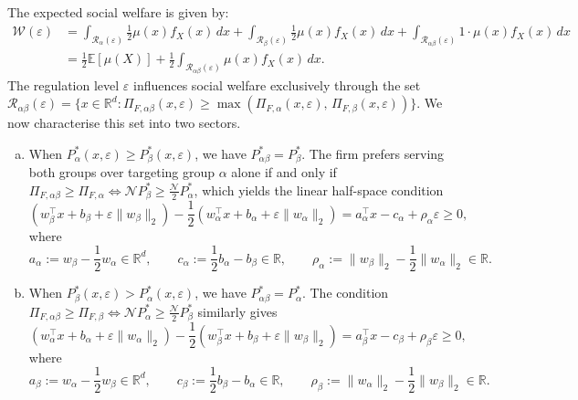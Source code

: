 The expected social welfare is given by:
\begin{equation}
\label{eq:welfare_simplified}
\begin{aligned}
\mathcal{W}(\varepsilon) &= \int_{\mathcal{R}_\alpha(\varepsilon)} \frac{1}{2} \mu(x) f_X(x) \, dx + \int_{\mathcal{R}_\beta(\varepsilon)} \frac{1}{2} \mu(x) f_X(x) \, dx + \int_{\mathcal{R}_{\alpha\beta}(\varepsilon)} 1 \cdot \mu(x) f_X(x) \, dx\\
&= \frac{1}{2} \mathbb{E}[\mu(X)] + \frac{1}{2} \int_{\mathcal{R}_{\alpha\beta}(\varepsilon)} \mu(x) f_X(x) \, dx.
\end{aligned}
\end{equation}
The regulation level $\varepsilon$ influences social welfare exclusively through the set $\mathcal{R}_{\alpha\beta}(\varepsilon) = \bigl\{x \in \mathbb{R}^d : \Pi_{F,\alpha\beta}(x,\varepsilon) \ge \max(\Pi_{F,\alpha}(x,\varepsilon),\, \Pi_{F,\beta}(x,\varepsilon))\bigr\}$. We now characterise this set into two sectors.
\begin{enumerate}[(a)]
\item When $P_\alpha^*(x, \varepsilon) \ge P_\beta^*(x, \varepsilon)$, we have $P_{\alpha\beta}^* = P_\beta^*$. The firm prefers serving both groups over targeting group $\alpha$ alone if and only if $\Pi_{F,\alpha\beta} \ge \Pi_{F,\alpha} \iff \mathcal{N} P_\beta^* \ge \frac{\mathcal{N}}{2} P_\alpha^*$, which yields the linear half-space condition
  \begin{equation}
  \label{eq:halfspace_alpha}
  \left(w_\beta^\top x + b_\beta + \varepsilon \|w_\beta\|_2\right) - \frac{1}{2}\left(w_\alpha^\top x + b_\alpha + \varepsilon \|w_\alpha\|_2\right) = a_\alpha^\top x - c_\alpha + \rho_\alpha \varepsilon \ge 0,
  \end{equation}
  where
  \begin{equation}
  \label{eq:params_alpha}
  a_\alpha := w_\beta - \frac{1}{2}w_\alpha \in \mathbb{R}^d, \qquad c_\alpha := \frac{1}{2}b_\alpha - b_\beta \in \mathbb{R}, \qquad \rho_\alpha := \|w_\beta\|_2 - \frac{1}{2}\|w_\alpha\|_2 \in \mathbb{R}.
  \end{equation}

\item When $P_\beta^*(x, \varepsilon) > P_\alpha^*(x, \varepsilon)$, we have $P_{\alpha\beta}^* = P_\alpha^*$. The condition $\Pi_{F,\alpha\beta} \ge \Pi_{F,\beta} \iff \mathcal{N} P_\alpha^* \ge \frac{\mathcal{N}}{2} P_\beta^*$ similarly gives
  \begin{equation}
  \label{eq:halfspace_beta}
  \left(w_\alpha^\top x + b_\alpha + \varepsilon \|w_\alpha\|_2\right) - \frac{1}{2}\left(w_\beta^\top x + b_\beta + \varepsilon \|w_\beta\|_2\right) = a_\beta^\top x - c_\beta + \rho_\beta \varepsilon \ge 0,
  \end{equation}
  where
  \begin{equation}
  \label{eq:params_beta}
  a_\beta := w_\alpha - \frac{1}{2}w_\beta \in \mathbb{R}^d, \qquad c_\beta := \frac{1}{2}b_\beta - b_\alpha \in \mathbb{R}, \qquad \rho_\beta := \|w_\alpha\|_2 - \frac{1}{2}\|w_\beta\|_2 \in \mathbb{R}.
  \end{equation}
\end{enumerate}

